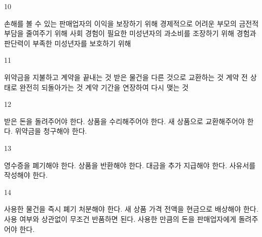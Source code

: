 \documentclass[fs9,seriesRus]{korfarm-base}
\begin{document}
\begin{kfSentenceUnit}{10}{}
\begin{kfChoices}
\kfChoice 손해를 볼 수 있는 판매업자의 이익을 보장하기 위해
\kfChoice 경제적으로 어려운 부모의 금전적 부담을 줄여주기 위해
\kfChoice 사회 경험이 필요한 미성년자의 과소비를 조장하기 위해
\kfChoice 경험과 판단력이 부족한 미성년자를 보호하기 위해
\end{kfChoices}
\end{kfSentenceUnit}

\begin{kfSentenceUnit}{11}{}
\begin{kfChoices}
\kfChoice 위약금을 지불하고 계약을 끝내는 것
\kfChoice 받은 물건을 다른 것으로 교환하는 것
\kfChoice 계약 전 상태로 완전히 되돌아가는 것
\kfChoice 계약 기간을 연장하여 다시 맺는 것
\end{kfChoices}
\end{kfSentenceUnit}

\begin{kfSentenceUnit}{12}{}
\begin{kfChoices}
\kfChoice 받은 돈을 돌려주어야 한다.
\kfChoice 상품을 수리해주어야 한다.
\kfChoice 새 상품으로 교환해주어야 한다.
\kfChoice 위약금을 청구해야 한다.
\end{kfChoices}
\end{kfSentenceUnit}

\begin{kfSentenceUnit}{13}{}
\begin{kfChoices}
\kfChoice 영수증을 폐기해야 한다.
\kfChoice 상품을 반환해야 한다.
\kfChoice 대금을 추가 지급해야 한다.
\kfChoice 사유서를 작성해야 한다.
\end{kfChoices}
\end{kfSentenceUnit}

\begin{kfSentenceUnit}{14}{}
\begin{kfChoices}
\kfChoice 사용한 물건을 즉시 폐기 처분해야 한다.
\kfChoice 새 상품 가격 전액을 현금으로 배상해야 한다.
\kfChoice 사용 여부와 상관없이 무조건 반품하면 된다.
\kfChoice 사용한 만큼의 돈을 판매업자에게 돌려주어야 한다.
\end{kfChoices}
\end{kfSentenceUnit}
\end{document}
